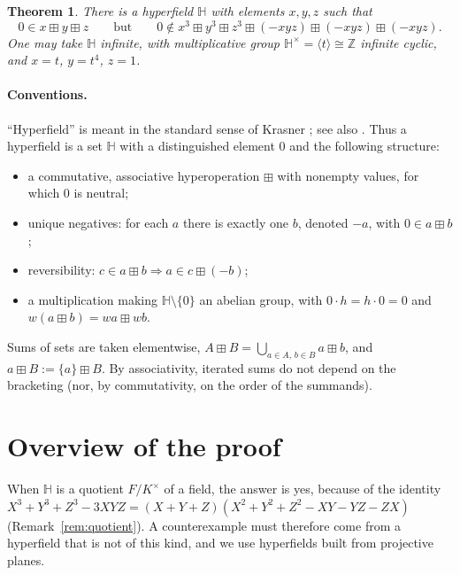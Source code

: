 \documentclass[11pt]{article}
\newtheorem{theorem}{Theorem}
\theoremstyle{definition}
\theoremstyle{remark}
\newcommand{\HH}{\mathbb{H}}
\newcommand{\Z}{\mathbb{Z}}
\newcommand{\bp}{\boxplus}
\begin{document}
\begin{theorem}\label{thm:main}
There is a hyperfield $\HH$ with elements $x,y,z$ such that
\[
0\in x\bp y\bp z
\qquad\text{but}\qquad
0\notin x^3\bp y^3\bp z^3\bp(-xyz)\bp(-xyz)\bp(-xyz).
\]
One may take $\HH$ infinite, with multiplicative group $\HH^\times=\langle t\rangle\cong\Z$ infinite cyclic, and $x=t$, $y=t^4$, $z=1$.
\end{theorem}

\paragraph{Conventions.} ``Hyperfield'' is meant in the standard sense of Krasner \cite{Kr57,Kr83}; see also \cite{Viro,BB}. Thus a hyperfield is a set $\HH$ with a distinguished element $0$ and the following structure:
\begin{itemize}[nosep]
\item a commutative, associative hyperoperation $\bp$ with nonempty values, for which $0$ is neutral;
\item unique negatives: for each $a$ there is exactly one $b$, denoted $-a$, with $0\in a\bp b$;
\item reversibility: $c\in a\bp b\Rightarrow a\in c\bp(-b)$;
\item a multiplication making $\HH\setminus\{0\}$ an abelian group, with $0\cdot h=h\cdot 0=0$ and $w(a\bp b)=wa\bp wb$.
\end{itemize}
Sums of sets are taken elementwise, $A\bp B=\bigcup_{a\in A,\,b\in B}a\bp b$, and $a\bp B:=\{a\}\bp B$. By associativity, iterated sums do not depend on the bracketing (nor, by commutativity, on the order of the summands).

\section{Overview of the proof}

When $\HH$ is a quotient $F/K^\times$ of a field, the answer is yes, because of the identity $X^3+Y^3+Z^3-3XYZ=(X+Y+Z)(X^2+Y^2+Z^2-XY-YZ-ZX)$ (Remark~\ref{rem:quotient}). A counterexample must therefore come from a hyperfield that is not of this kind, and we use hyperfields built from projective planes.
\end{document}
